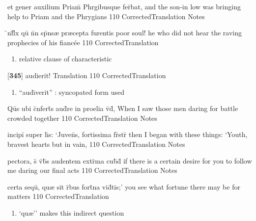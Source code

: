 \latline
  {et gener auxilium Priam\={} Phrgibusque fer\={}bat,}
  { and the son-in low was bringing help to Priam and the Phrygians }
  {110}
  { CorrectedTranslation }
  { Notes }


\latline
  {\={\macron {\i}}nf\={}l\={\macron {\i}}x qu\={\macron {\i}} n\={}n sp\={}ns{\ae} pr{\ae}cepta furentis}
  { poor soul! he who did not hear the raving prophecies of his fianc{\'e}e}
  {110}
  { CorrectedTranslation }
  { \begin{enumerate}
  	\item relative clause of characteristic
  \end{enumerate} }


\latline
  {[\textbf{345}] audierit!}
  { Translation }
  {110}
  { CorrectedTranslation }
  { \begin{enumerate}
  	\item ``aud\={\i}verit'' : syncopated form used
  \end{enumerate} }


\latline
  {Qu\={}s ubi c\={}nfert\={}s aud\={}re in proelia v\={\macron {\i}}d\={\macron {\i}},}
  { When I saw those men daring for battle crowded together }
  {110}
  { CorrectedTranslation }
  { Notes }


\latline
  {incipi\={} super h\={\macron {\i}}s: `Juven\={}s, fortissima fr\={}str\={}}
  { then I began with these things:  `Youth, bravest hearts but in vain, }
  {110}
  { CorrectedTranslation }
  { Notes }


\latline
  {pectora, s\={\macron {\i}} v\={}b\={\macron {\i}}s audentem extr\={}ma cub\={\macron {\i}}d\={}}
  { if there is a certain desire for you to follow me daring our final acts  }
  {110}
  { CorrectedTranslation }
  { Notes }


\latline
  {certa sequ\={\macron {\i}}, qu{\ae} sit r\={}bus fort\={}na vid\={}tis;'}
  { you see what fortune there may be for matters }
  {110}
  { CorrectedTranslation }
  { \begin{enumerate}
      	\item `qu{\ae}'' makes this indirect question
        \end{enumerate} 
  }


